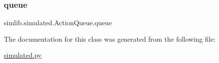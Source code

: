 \subsubsection{\texorpdfstring{queue}{queue}}
{\footnotesize\ttfamily simlib.\+simulated.\+Action\+Queue.\+queue}



The documentation for this class was generated from the following file\+:\begin{DoxyCompactItemize}
\item 
\mbox{\hyperlink{simulated_8py}{simulated.\+py}}\end{DoxyCompactItemize}
